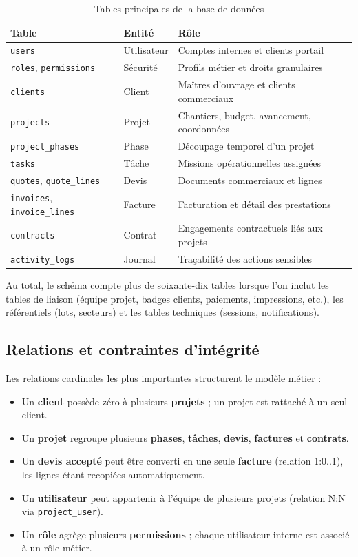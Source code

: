 \begin{table}[H]
\caption{Tables principales de la base de données}
\label{tab:db_tables}
\centering
\small
\begin{tabular}{|l|p{4.5cm}|p{5.5cm}|}
\hline
\textbf{Table} & \textbf{Entité} & \textbf{Rôle} \\
\hline
\texttt{users} & Utilisateur & Comptes internes et clients portail \\
\hline
\texttt{roles}, \texttt{permissions} & Sécurité & Profils métier et droits granulaires \\
\hline
\texttt{clients} & Client & Maîtres d'ouvrage et clients commerciaux \\
\hline
\texttt{projects} & Projet & Chantiers, budget, avancement, coordonnées \\
\hline
\texttt{project\_phases} & Phase & Découpage temporel d'un projet \\
\hline
\texttt{tasks} & Tâche & Missions opérationnelles assignées \\
\hline
\texttt{quotes}, \texttt{quote\_lines} & Devis & Documents commerciaux et lignes \\
\hline
\texttt{invoices}, \texttt{invoice\_lines} & Facture & Facturation et détail des prestations \\
\hline
\texttt{contracts} & Contrat & Engagements contractuels liés aux projets \\
\hline
\texttt{activity\_logs} & Journal & Traçabilité des actions sensibles \\
\hline
\end{tabular}
\end{table}

Au total, le schéma compte plus de soixante-dix tables lorsque l'on inclut les
tables de liaison (équipe projet, badges clients, paiements, impressions, etc.),
les référentiels (lots, secteurs) et les tables techniques (sessions, notifications).

\subsection{Relations et contraintes d'intégrité}

Les relations cardinales les plus importantes structurent le modèle métier :

\begin{itemize}
  \item Un \textbf{client} possède zéro à plusieurs \textbf{projets} ; un projet
  est rattaché à un seul client.
  \item Un \textbf{projet} regroupe plusieurs \textbf{phases}, \textbf{tâches},
  \textbf{devis}, \textbf{factures} et \textbf{contrats}.
  \item Un \textbf{devis accepté} peut être converti en une seule \textbf{facture}
  (relation 1:0..1), les lignes étant recopiées automatiquement.
  \item Un \textbf{utilisateur} peut appartenir à l'équipe de plusieurs projets
  (relation N:N via \texttt{project\_user}).
  \item Un \textbf{rôle} agrège plusieurs \textbf{permissions} ; chaque utilisateur
  interne est associé à un rôle métier.
\end{itemize}


